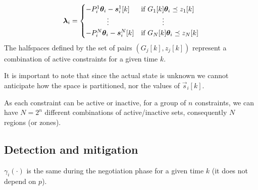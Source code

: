 \documentclass{ifacconf}  %
\begin{document}
\begin{equation}
  \begin{aligned}
    \label{eq:lambdafuntheta}
    \lambdai=
    \begin{cases}
      -P_{i}^{1}\vec{\theta}_{i}-\vec{s}_{i}^{1}[k]&\text{if}\ G_{1}[k]\thetai \preceq z_{1}[k] \\
      \qquad\quad \vdots&\qquad\quad \vdots\\
      -P_{i}^{N}\vec{\theta}_{i}-\vec{s}_{i}^{N}[k]&\text{if}\ G_{N}[k]\thetai \preceq z_{N}[k] \\
    \end{cases}
  \end{aligned}
\end{equation}
The halfspaces defined by the set of pairs $(G_{j}[k],z_{j}[k])$ represent a combination of active constraints for a given time $k$.

\begin{challenge}
It is important to note that since the actual state is unknown we cannot anticipate how the space is partitioned, nor the values of $\vec{s}_{i}[k]$.
\end{challenge}
 As each constraint can be active or inactive, for a group of $n$ constraints,  we can have $N=2^{n}$ different combinations of active/inactive sets, consequently $N$ regions (or zones).


\subsection{Detection and mitigation}
\begin{assumption}
  $\gamma_{i}(\cdot)$ is the same during the negotiation phase for a given time $k$ (it does not depend on $p$).
\end{assumption}
\end{document}
